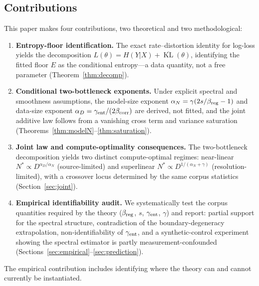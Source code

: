 \documentclass[12pt]{article}
\newcommand{\KL}{\operatorname{KL}}
\theoremstyle{remark}
\begin{document}
\subsection*{Contributions}
This paper makes four contributions, two theoretical and two methodological:
\begin{enumerate}[label=\textbf{(\roman*)}]
\item \textbf{Entropy-floor identification.}
  The exact rate--distortion identity for log-loss yields the decomposition
  $L(\theta)=H(Y|X)+\overline{\KL}(\theta)$, identifying the fitted floor $E$
  as the conditional entropy---a data quantity, not a free parameter
  (Theorem~\ref{thm:decomp}).
\item \textbf{Conditional two-bottleneck exponents.}
  Under explicit spectral and smoothness assumptions, the model-size exponent
  $\alpha_N=\gamma(2s/\beta_{\rm reg}-1)$ and data-size exponent
  $\alpha_D=\gamma_{\rm ent}/(2\beta_{\rm corr})$ are derived, not fitted, and
  the joint additive law follows from a vanishing cross term and variance
  saturation (Theorems~\ref{thm:modelN}--\ref{thm:saturation}).
\item \textbf{Joint law and compute-optimality consequences.}
  The two-bottleneck decomposition yields two distinct compute-optimal regimes:
  near-linear $N^*\!\propto\!D^{\alpha_D/\alpha_N}$ (source-limited) and
  superlinear $N^*\!\propto\!D^{1/(\alpha_N+\gamma)}$ (resolution-limited), with
  a crossover locus determined by the same corpus statistics
  (Section~\ref{sec:joint}).
\item \textbf{Empirical identifiability audit.}
  We systematically test the corpus quantities required by the theory
  ($\beta_{\rm reg}$, $s$, $\gamma_{\rm ent}$, $\gamma$) and report: partial
  support for the spectral structure, contradiction of the boundary-degeneracy
  extrapolation, non-identifiability of $\gamma_{\rm ent}$, and a
  synthetic-control experiment showing the spectral estimator is partly
  measurement-confounded
  (Sections~\ref{sec:empirical}--\ref{sec:prediction}).
\end{enumerate}
The empirical contribution includes identifying where the theory can and
cannot currently be instantiated.
\end{document}
